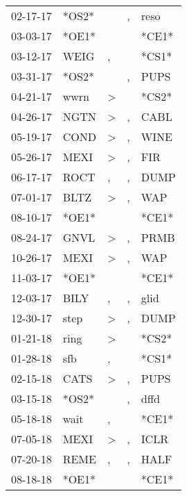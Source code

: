 \begin{supertabular}{lllll}
 02-17-17 &  *OS2* &                  &                , &   reso \\
 03-03-17 &  *OE1* &                  &                  &  *CE1* \\
 03-12-17 &   WEIG &                , &                  &  *CS1* \\
 03-31-17 &  *OS2* &                  &                , &   PUPS \\
 04-21-17 &   wwrn &     \textgreater &                  &  *CS2* \\
 04-26-17 &   NGTN &     \textgreater &                , &   CABL \\
 05-19-17 &   COND &     \textgreater &                , &   WINE \\
 05-26-17 &   MEXI &     \textgreater &                , &    FIR \\
 06-17-17 &   ROCT &                , &                , &   DUMP \\
 07-01-17 &   BLTZ &     \textgreater &                , &    WAP \\
 08-10-17 &  *OE1* &                  &                  &  *CE1* \\
 08-24-17 &   GNVL &     \textgreater &                , &   PRMB \\
 10-26-17 &   MEXI &     \textgreater &                , &    WAP \\
 11-03-17 &  *OE1* &                  &                  &  *CE1* \\
 12-03-17 &   BILY &                , &                , &   glid \\
 12-30-17 &   step &     \textgreater &                , &   DUMP \\
 01-21-18 &   ring &     \textgreater &                  &  *CS2* \\
 01-28-18 &    sfb &                , &                  &  *CS1* \\
 02-15-18 &   CATS &     \textgreater &                , &   PUPS \\
 03-15-18 &  *OS2* &                  &                , &   dffd \\
 05-18-18 &   wait &                , &                  &  *CE1* \\
 07-05-18 &   MEXI &     \textgreater &                , &   ICLR \\
 07-20-18 &   REME &                , &                , &   HALF \\
 08-18-18 &  *OE1* &                  &                  &  *CE1* \\

\end{supertabular}
